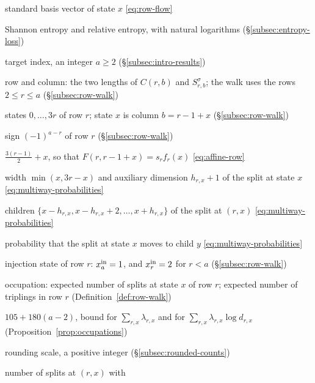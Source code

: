 {\begin{list}{}{\setlength{\leftmargin}{0.22\textwidth}%
 \setlength{\labelwidth}{0.2\textwidth}\setlength{\labelsep}{0.02\textwidth}%
 \setlength{\itemsep}{1pt}\setlength{\parsep}{0pt}\setlength{\topsep}{0pt}%
 \renewcommand{\makelabel}[1]{#1\hfil}}
\item[\(\mathbf e_x\)] standard basis vector of state \(x\)
 \eqref{eq:row-flow}
\item[\(H\), \(D(\cdot\Vert\cdot)\)] Shannon entropy and relative entropy,
 with natural logarithms (\S\ref{subsec:entropy-loss})
\item[\(a\)] target index, an integer \(a\ge2\)
 (\S\ref{subsec:intro-results})
\item[\(r\), \(b\)] row and column: the two lengths of \(C(r,b)\) and
 \(S^\sigma_{r,b}\); the walk uses the rows \(2\le r\le a\)
 (\S\ref{subsec:row-walk})
\item[\(x\), \(y\)] states \(0,\ldots,3r\) of row \(r\); state \(x\) is
 column \(b=r-1+x\) (\S\ref{subsec:row-walk})
\item[\(\sigma_r\)] sign \((-1)^{a-r}\) of row \(r\)
 (\S\ref{subsec:row-walk})
\item[\(f_r(x)\)] \(\frac{3(r-1)}2+x\), so that
 \(F(r,r-1+x)=s_rf_r(x)\) \eqref{eq:affine-row}
\item[\(h_{r,x}\), \(d_{r,x}\)] width \(\min(x,3r-x)\) and auxiliary
 dimension \(h_{r,x}+1\) of the split at state \(x\)
 \eqref{eq:multiway-probabilities}
\item[\(\mathcal Y_{r,x}\)] children
 \(\{x-h_{r,x},x-h_{r,x}+2,\ldots,x+h_{r,x}\}\) of the split at
 \((r,x)\) \eqref{eq:multiway-probabilities}
\item[\(q_{r,x,y}\)] probability that the split at state \(x\) moves to
 child \(y\) \eqref{eq:multiway-probabilities}
\item[\(\xin_r\)] injection state of row \(r\): \(x^{\mathrm{in}}_a=1\), and
 \(x^{\mathrm{in}}_r=2\) for \(r<a\) (\S\ref{subsec:row-walk})
\item[\(\lambda_{r,x}\), \(\mu_r\)] occupation: expected number of
 splits at state \(x\) of row \(r\); expected number of triplings in
 row \(r\) (Definition~\ref{def:row-walk})
\item[\(\Gamma_a\)] \(105+180(a-2)\), bound for
 \(\sum_{r,x}\lambda_{r,x}\) and for
 \(\sum_{r,x}\lambda_{r,x}\log d_{r,x}\)
 (Proposition~\ref{prop:occupations})
\item[\(K\)] rounding scale, a positive integer
 (\S\ref{subsec:rounded-counts})
\item[\(n_{r,x,y}\), \(w_{r,x}\)] number of splits at \((r,x)\) with

\end{list}}
